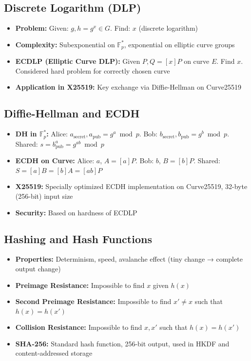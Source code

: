 \documentclass[11pt,a4paper,oneside]{book}
\begin{document}
\vspace{-0.2cm}\subsection{Discrete Logarithm (DLP)}
\begin{itemize}
  \item \textbf{Problem:} Given: $g, h = g^x \in G$. Find: $x$ (discrete logarithm)
  \item \textbf{Complexity:} Subexponential on $\mathbb{F}_p^*$, exponential on elliptic curve groups
  \item \textbf{ECDLP (Elliptic Curve DLP):} Given $P, Q = [x]P$ on curve $E$. Find $x$. Considered hard problem for correctly chosen curve
  \item \textbf{Application in X25519:} Key exchange via Diffie-Hellman on Curve25519
\end{itemize}
\vspace{-0.2cm}\subsection{Diffie-Hellman and ECDH}
\begin{itemize}
  \item \textbf{DH in $\mathbb{F}_p^*$:} Alice: $a_{\text{secret}}, a_{\text{pub}} = g^a \bmod p$. Bob: $b_{\text{secret}}, b_{\text{pub}} = g^b \bmod p$. Shared: $s = b_{\text{pub}}^a = g^{ab} \bmod p$
  \item \textbf{ECDH on Curve:} Alice: $a$, $A = [a]P$. Bob: $b$, $B = [b]P$. Shared: $S = [a]B = [b]A = [ab]P$
  \item \textbf{X25519:} Specially optimized ECDH implementation on Curve25519, 32-byte (256-bit) input size
  \item \textbf{Security:} Based on hardness of ECDLP
\end{itemize}
\vspace{-0.2cm}\subsection{Hashing and Hash Functions}
\begin{itemize}
  \item \textbf{Properties:} Determinism, speed, avalanche effect (tiny change → complete output change)
  \item \textbf{Preimage Resistance:} Impossible to find $x$ given $h(x)$
  \item \textbf{Second Preimage Resistance:} Impossible to find $x' \neq x$ such that $h(x) = h(x')$
  \item \textbf{Collision Resistance:} Impossible to find $x, x'$ such that $h(x) = h(x')$
  \item \textbf{SHA-256:} Standard hash function, 256-bit output, used in HKDF and content-addressed storage
\end{itemize}
\end{document}
